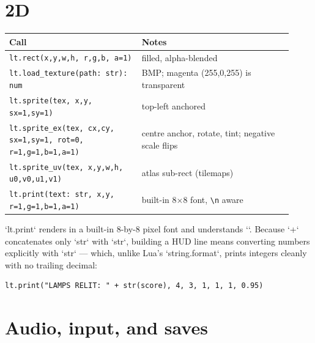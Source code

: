 \section{2D}

\begin{center}
\small\begin{tabular}{@{}p{0.43\linewidth}p{0.49\linewidth}@{}}
\toprule
\textbf{Call} & \textbf{Notes} \\
\midrule
\texttt{lt.rect(x,y,w,h, r,g,b, a=1)} & filled, alpha-blended \\
\texttt{lt.load\_texture(path: str): num} & BMP; magenta (255,0,255) is transparent \\
\texttt{lt.sprite(tex, x,y, sx=1,sy=1)} & top-left anchored \\
\texttt{lt.sprite\_ex(tex, cx,cy, sx=1,sy=1, rot=0, r=1,g=1,b=1,a=1)} & centre anchor, rotate, tint; negative scale flips \\
\texttt{lt.sprite\_uv(tex, x,y,w,h, u0,v0,u1,v1)} & atlas sub-rect (tilemaps) \\
\texttt{lt.print(text: str, x,y, r=1,g=1,b=1,a=1)} & built-in 8$\times$8 font, \texttt{\textbackslash n} aware \\
\bottomrule
\end{tabular}
\end{center}

\noindent
`lt.print` renders in a built-in 8-by-8 pixel font and understands `\n`.
Because `+` concatenates only `str` with `str`, building a HUD line means
converting numbers explicitly with `str` --- which, unlike Lua's
`string.format`, prints integers cleanly with no trailing decimal:

\begin{lstlisting}[language=wick]
lt.print("LAMPS RELIT: " + str(score), 4, 3, 1, 1, 1, 0.95)
\end{lstlisting}

\section{Audio, input, and saves}

